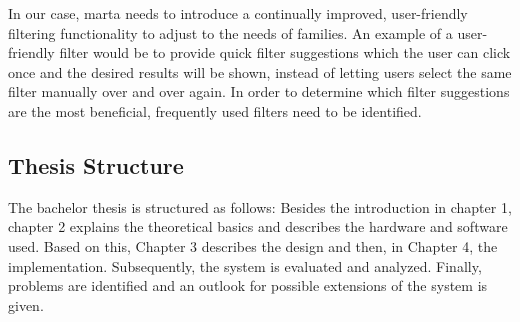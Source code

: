 In our case, marta needs to introduce a continually improved, user-friendly filtering functionality to adjust to the needs of families. An example of a user-friendly filter would be to provide quick filter suggestions which the user can click once and the desired results will be shown, instead of letting users select the same filter manually over and over again. In order to determine which filter suggestions are the most beneficial, frequently used filters need to be identified.

\subsection{Thesis Structure}%
The bachelor thesis is structured as follows: Besides the introduction in chapter 1, chapter 2 explains the theoretical basics and describes the hardware and software used. Based on this, Chapter 3 describes the design and then, in Chapter 4, the implementation. Subsequently, the system is evaluated and analyzed. Finally, problems are identified and an outlook for possible extensions of the system is given.
